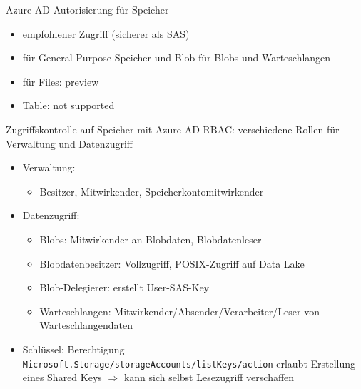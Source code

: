 
\begin{flashcard}[Definition]{Azure-AD-Autorisierung für Speicher}
    \begin{itemize}
        \item empfohlener Zugriff (sicherer als SAS)
        \item für General-Purpose-Speicher und Blob für Blobs und Warteschlangen
        \item für Files: preview
        \item Table: not supported
    \end{itemize}
\end{flashcard}

\begin{flashcard}[Definition]{Zugriffskontrolle auf Speicher mit Azure AD}
    RBAC: verschiedene Rollen für Verwaltung und Datenzugriff
    \begin{itemize}
        \item Verwaltung:
            \begin{itemize}
                \item Besitzer, Mitwirkender, Speicherkontomitwirkender
            \end{itemize}
        \item Datenzugriff:
            \begin{itemize}
                \item Blobs: Mitwirkender an Blobdaten, Blobdatenleser
                \item Blobdatenbesitzer: Vollzugriff, POSIX-Zugriff auf Data Lake
                \item Blob-Delegierer: erstellt User-SAS-Key
                \item Warteschlangen: Mitwirkender/Absender/Verarbeiter/Leser von Warteschlangendaten
            \end{itemize}
        \item Schlüssel:\newline
            Berechtigung \texttt{Microsoft.Storage/storageAccounts/listKeys/action} erlaubt Erstellung eines Shared Keys $\Rightarrow$ kann sich selbst Lesezugriff verschaffen
    \end{itemize}
\end{flashcard}

